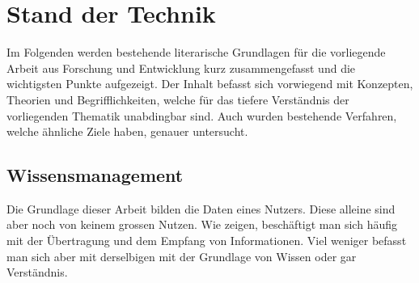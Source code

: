 


\chapter{Stand der Technik} \label{literatur}


Im Folgenden werden bestehende literarische Grundlagen für die vorliegende Arbeit aus Forschung und Entwicklung kurz zusammengefasst und die wichtigsten Punkte aufgezeigt. Der Inhalt befasst sich vorwiegend mit Konzepten, Theorien und Begrifflichkeiten, welche für das tiefere Verständnis der vorliegenden Thematik unabdingbar sind. Auch wurden bestehende Verfahren, welche ähnliche Ziele haben, genauer untersucht.





\section{Wissensmanagement}



Die Grundlage dieser Arbeit bilden die Daten eines Nutzers. Diese alleine sind aber noch von keinem grossen Nutzen. Wie \cite{bellinger2004data}
 zeigen, beschäftigt man sich häufig mit der Übertragung und dem Empfang von Informationen. Viel weniger befasst man sich aber mit derselbigen mit der Grundlage von Wissen oder gar Verständnis. 
 
